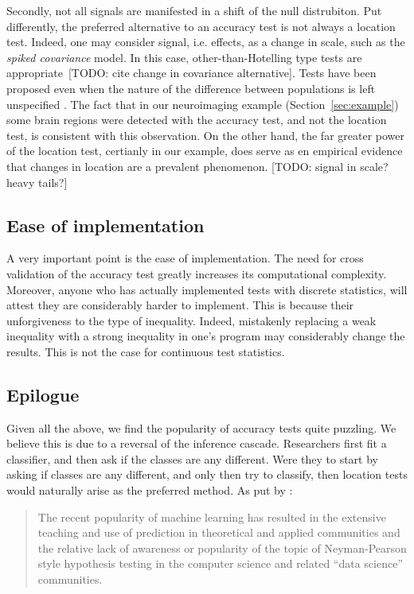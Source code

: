 \documentclass[12pt,a4paper]{article}
\begin{document}
Secondly, not all signals are manifested in a shift of the null distrubiton. 
Put differently, the preferred alternative to an accuracy test is not always a location test. 
Indeed, one may consider signal, i.e. effects, as a change in scale, such as the \emph{spiked covariance} model. In this case, other-than-Hotelling type tests are appropriate~[TODO: cite change in covariance alternative].
Tests have been proposed even when the nature of the difference between populations is left unspecified \citep[e.g.][]{gretton_kernel_2012}.
The fact that in our neuroimaging example (Section~\ref{sec:example}) some brain regions were detected with the accuracy test, and not the location test, is consistent with this observation. 
On the other hand, the far greater power of the location test, certianly in our example, does serve as en empirical evidence that changes in location are a prevalent phenomenon. 
[TODO: signal in scale? heavy tails?]

\subsection{Ease of implementation}
A very important point is the ease of implementation. 
The need for cross validation of the accuracy test greatly increases its computational complexity. 
Moreover, anyone who has actually implemented tests with discrete statistics, will attest they are considerably harder to implement. This is because their unforgiveness to the type of inequality. 
Indeed, mistakenly replacing a weak inequality with a strong inequality in one's program may considerably change the results. 
This is not the case for continuous test statistics. 



\subsection{Epilogue}
Given all the above, we find the popularity of accuracy tests quite puzzling. 
We believe this is due to a reversal of the inference cascade. 
Researchers first fit a classifier, and then ask if the classes are any different.
Were they to start by asking if classes are any different, and only then try to classify, then location tests would naturally arise as the preferred method. 
As put by \cite{ramdas_classification_2016}:
\begin{quote}
The recent popularity of machine learning has resulted in the extensive teaching and use
of prediction in theoretical and applied communities and the relative lack of awareness or
popularity of the topic of Neyman-Pearson style hypothesis testing in the computer science
and related ``data science'' communities.
\end{quote}
\end{document}
